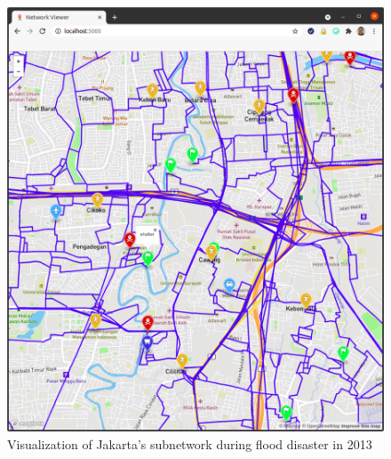 \documentclass[conference]{IEEEtran}
\begin{document}
\begin{figure}
\centerline{\includegraphics[scale=0.25]{subnetwork-visualization-zoom-1-jakarta.png}}
\caption{Visualization of Jakarta's subnetwork during flood disaster in 2013}
\label{fig_jakarta_subnetwork_visualized}
\end{figure}
\end{document}
